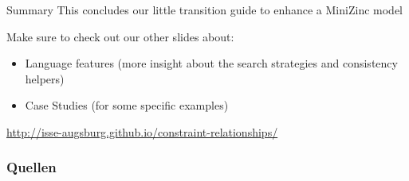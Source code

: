 \documentclass[10pt,xcolor={dvipsnames},fleqn]{beamer}
\begin{document}
\begin{frame}{Summary}
This concludes our little transition guide to enhance a MiniZinc model


\vspace*{2ex}

Make sure to check out our other slides about:
\begin{itemize}
\item Language features (more insight about the search strategies and consistency helpers)
\item Case Studies (for some specific examples)
\end{itemize}

\vspace*{2ex}

\url{http://isse-augsburg.github.io/constraint-relationships/}
\end{frame}


\begin{frame}[allowframebreaks]
        \frametitle{Quellen}
        
        
\end{frame}
\end{document}
